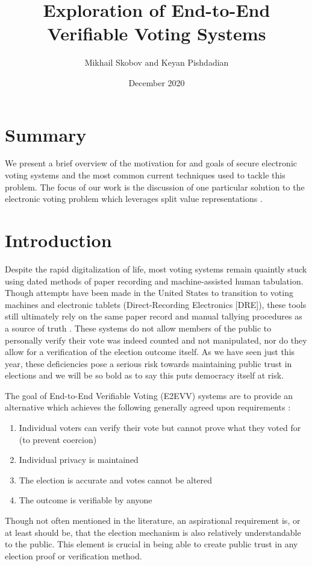 \documentclass{article}
\title{Exploration of End-to-End Verifiable Voting Systems}
\author{Mikhail Skobov and Keyan Pishdadian}
\date{December 2020}
\begin{document}
\maketitle

\section*{Summary}
We present a brief overview of the motivation for and goals of secure electronic voting systems and the most common current techniques used to tackle this problem. The focus of our work is the discussion of one particular solution to the electronic voting problem which leverages split value representations \cite{svr_vote}.

\section{Introduction}
Despite the rapid digitalization of life, most voting systems remain quaintly stuck using dated methods of paper recording and machine-assisted human tabulation. Though attempts have been made in the United States to transition to voting machines and electronic tablets (Direct-Recording Electronics [DRE]), these tools still ultimately rely on the same paper record and manual tallying procedures as a source of truth \cite{ncsl}. These systems do not allow members of the public to personally verify their vote was indeed counted and not manipulated, nor do they allow for a verification of the election outcome itself. As we have seen just this year, these deficiencies pose a serious risk towards maintaining public trust in elections and we will be so bold as to say this puts democracy itself at risk.

The goal of End-to-End Verifiable Voting (E2EVV) systems are to provide an alternative which achieves the following  generally agreed upon requirements \cite{mit}:
\begin{enumerate}
\item
    Individual voters can verify their vote but cannot prove what they voted for (to prevent coercion)
\item
    Individual privacy is maintained
\item
    The election is accurate and votes cannot be altered
\item
    The outcome is verifiable by anyone
\end{enumerate}

Though not often mentioned in the literature, an aspirational requirement is, or at least should be, that the election mechanism is also relatively understandable to the public. This element is crucial in being able to create public trust in any election proof or verification method.
\end{document}

